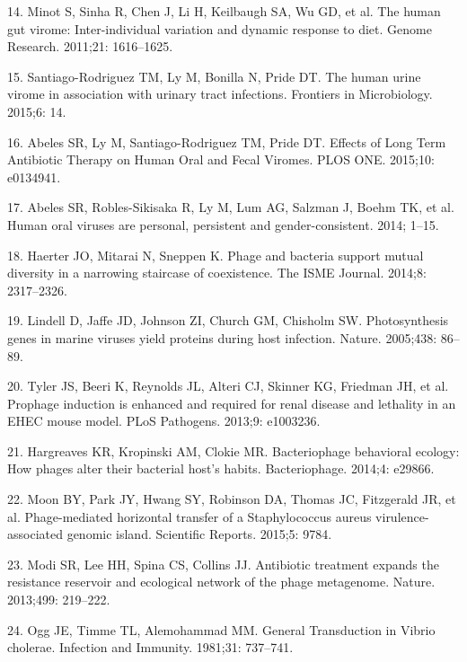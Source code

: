 \documentclass[12pt,]{article}
\begin{document}
\hypertarget{ref-Minot:2011ez}{}
14. Minot S, Sinha R, Chen J, Li H, Keilbaugh SA, Wu GD, et al. The
human gut virome: Inter-individual variation and dynamic response to
diet. Genome Research. 2011;21: 1616--1625.

\hypertarget{ref-SantiagoRodriguez:2015gd}{}
15. Santiago-Rodriguez TM, Ly M, Bonilla N, Pride DT. The human urine
virome in association with urinary tract infections. Frontiers in
Microbiology. 2015;6: 14.

\hypertarget{ref-Abeles:2015dy}{}
16. Abeles SR, Ly M, Santiago-Rodriguez TM, Pride DT. Effects of Long
Term Antibiotic Therapy on Human Oral and Fecal Viromes. PLOS ONE.
2015;10: e0134941.

\hypertarget{ref-Abeles:2014kj}{}
17. Abeles SR, Robles-Sikisaka R, Ly M, Lum AG, Salzman J, Boehm TK, et
al. Human oral viruses are personal, persistent and gender-consistent.
2014; 1--15.

\hypertarget{ref-Haerter:2014ii}{}
18. Haerter JO, Mitarai N, Sneppen K. Phage and bacteria support mutual
diversity in a narrowing staircase of coexistence. The ISME Journal.
2014;8: 2317--2326.

\hypertarget{ref-Lindell:2005gz}{}
19. Lindell D, Jaffe JD, Johnson ZI, Church GM, Chisholm SW.
Photosynthesis genes in marine viruses yield proteins during host
infection. Nature. 2005;438: 86--89.

\hypertarget{ref-Tyler:2013fl}{}
20. Tyler JS, Beeri K, Reynolds JL, Alteri CJ, Skinner KG, Friedman JH,
et al. Prophage induction is enhanced and required for renal disease and
lethality in an EHEC mouse model. PLoS Pathogens. 2013;9: e1003236.

\hypertarget{ref-Hargreaves:2014ja}{}
21. Hargreaves KR, Kropinski AM, Clokie MR. Bacteriophage behavioral
ecology: How phages alter their bacterial host's habits. Bacteriophage.
2014;4: e29866.

\hypertarget{ref-Moon:2015fa}{}
22. Moon BY, Park JY, Hwang SY, Robinson DA, Thomas JC, Fitzgerald JR,
et al. Phage-mediated horizontal transfer of a Staphylococcus aureus
virulence-associated genomic island. Scientific Reports. 2015;5: 9784.

\hypertarget{ref-Modi:2013fi}{}
23. Modi SR, Lee HH, Spina CS, Collins JJ. Antibiotic treatment expands
the resistance reservoir and ecological network of the phage metagenome.
Nature. 2013;499: 219--222.

\hypertarget{ref-Ogg:1981th}{}
24. Ogg JE, Timme TL, Alemohammad MM. General Transduction in Vibrio
cholerae. Infection and Immunity. 1981;31: 737--741.
\end{document}
